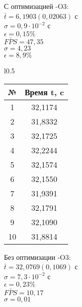 \documentclass[12pt, letterpaper]{article}
\begin{document}
     С оптимизацией -O3:\\                 

    $\bar{t} = 6,1903 (0,02063)$ с\\

    $\sigma = 0,9 \cdot 10^{-2}$ с\\
    
    $\epsilon = 0,15\%$\\
        
    $\bar{FPS} = 47,35$\\

    $\sigma = 4,23$\\

    $\epsilon = 8,9\%$\\

    \newpage
    \begin{wraptable}{l}{0.5\textwidth}
        \begin{tabular}{cc} 
        \toprule             %
        \textbf{№} & \textbf{Время t, c} \\
        \midrule             %
        1 & 32,1174 \\
        2 & 31,8332 \\
        3 & 32,1725 \\
        4 & 32,2244 \\
        5 & 32,1574 \\
        6 & 32,1550 \\
        7 & 31,9391 \\
        8 & 32,1791 \\
        9 & 32,1090 \\
        10 & 31,8814 \\
        \bottomrule          %
        \end{tabular}
    \end{wraptable}

    Без оптимизации -O3:\\                 

    $\bar{t} = 32,0769 (0,1069)$ с\\

    $\sigma = 7,3 \cdot 10^{-2}$ с\\
    
    $\epsilon = 0,23\%$\\
        
    $\bar{FPS} = 10,17$\\

    $\sigma = 0,01$\\
\end{document}
